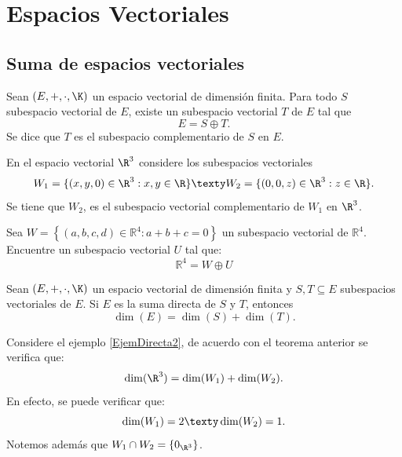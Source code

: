 \documentclass[compacto,10pt]{pubciencias-notas}
\begin{document}
\setcounter{section}{3}
\section{Espacios Vectoriales}
\setcounter{subsection}{7}
\subsection{Suma de espacios vectoriales}

\begin{teo}
    Sean $(E,+,\cdot,\K)$ un espacio vectorial de dimensión finita. Para todo $S$ subespacio vectorial de $E$, existe un subespacio vectorial $T$ de $E$ tal que 
    \[
        E = S \oplus T.
    \]
    Se dice que $T$ es el subespacio complementario de $S$ en $E$.
\end{teo}
\begin{ejem}\hspace{0pt}\label{EjemDirecta2} En el espacio vectorial $\R^{3}$ considere los subespacios vectoriales
\[
    W_{1} = \{(x,y,0)\in \R^3: x,y \in \R \}
    \texty 
    W_{2} = \{(0,0,z)\in \R^3: z \in \R\}.
\]
Se tiene que $W_2$, es el subespacio vectorial complementario de $W_1$ en $\R^{3}$.
\end{ejem}

\begin{ejer}\label{EjercicioSumaDirecta1}\hspace{0pt} Sea $W=\left\{(a,b,c,d)\in \mathbb{R}^{4} : a+b+c=0 \right\}$ un subespacio vectorial de $\mathbb{R}^{4}$. Encuentre un subespacio vectorial $U$ tal que:
\[\mathbb{R}^{4} = W \oplus U\]
\end{ejer}


\begin{teo}\label{TeoremaSumaDimensión}
Sean $(E,+,\cdot,\K)$ un espacio vectorial de dimensión finita y $S,T\subseteq E$ subespacios vectoriales de $E$. Si $E$ es la suma directa de $S$ y $T$, entonces
\[
    \dim(E) = \dim(S) + \dim(T).
\]
\end{teo}

\begin{ejem}\hspace{0pt} Considere el ejemplo \ref{EjemDirecta2}, de acuerdo con el teorema anterior se verifica que:
\[
    \dim(\R^{3}) = \dim(W_{1}) + \dim(W_{2}).
\]
En efecto, se puede verificar que:
\[
    \dim(W_{1}) = 2
    \texty
    \dim(W_{2}) = 1.
\]
Notemos además que $W_{1} \cap W_{2} = \{0_{\R^{3}}\}$.
\end{ejem}
\end{document}
